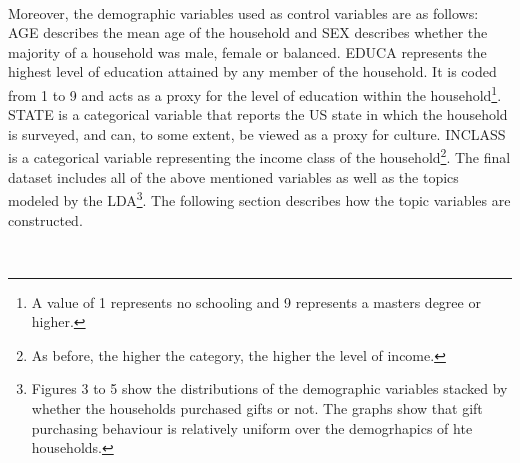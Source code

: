\

Moreover, the demographic variables used as control variables are as follows: AGE describes the mean age of the household and SEX describes whether the majority of a household was male, female or balanced. EDUCA represents the highest level of education attained by any member of the household. It is coded from 1 to 9 and acts as a proxy for the level of education within the household\footnote{A value of 1 represents no schooling and 9 represents a masters degree or higher.}. STATE is a categorical variable that reports the US state in which the household is surveyed, and can, to some extent, be viewed as a proxy for culture. INCLASS is a categorical variable representing the income class of the household\footnote{As before, the higher the category, the higher the level of income.}. The final dataset includes all of the above mentioned variables as well as the topics modeled by the LDA\footnote{Figures 3 to 5 show the distributions of the demographic variables stacked by whether the households purchased gifts or not. The graphs show that gift purchasing behaviour is relatively uniform over the demogrhapics of hte households.}. The following section describes how the topic variables are constructed. 

\












